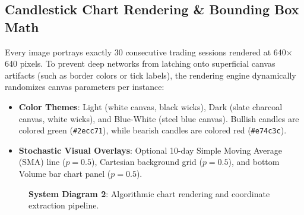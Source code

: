 \documentclass[10pt,journal]{IEEEtran}
\begin{document}
\subsection{Candlestick Chart Rendering \& Bounding Box Math}
Every image portrays exactly 30 consecutive trading sessions rendered at 640$\times$640 pixels. To prevent deep networks from latching onto superficial canvas artifacts (such as border colors or tick labels), the rendering engine dynamically randomizes canvas parameters per instance:
\begin{itemize}
  \item \textbf{Color Themes}: Light (white canvas, black wicks), Dark (slate charcoal canvas, white wicks), and Blue-White (steel blue canvas). Bullish candles are colored green (\texttt{\#2ecc71}), while bearish candles are colored red (\texttt{\#e74c3c}).
  \item \textbf{Stochastic Visual Overlays}: Optional 10-day Simple Moving Average (SMA) line ($p=0.5$), Cartesian background grid ($p=0.5$), and bottom Volume bar chart panel ($p=0.5$).
\end{itemize}

\begin{figure}[htbp]
\centering
{}
\caption{\textbf{System Diagram 2}: Algorithmic chart rendering and coordinate extraction pipeline.}
\label{fig:diag_render}
\end{figure}
\end{document}
